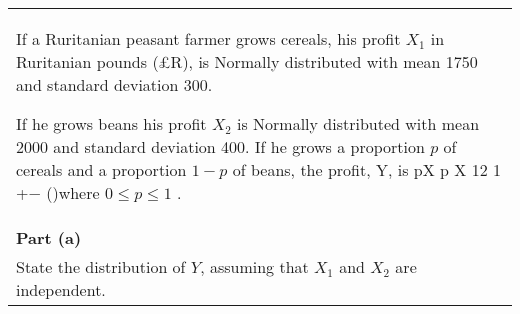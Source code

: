 \documentclass[a4paper,12pt]{article}
\begin{document}
\begin{table}[ht!]
     \centering
     \begin{tabular}{|p{15cm}|}
     \hline        
If a Ruritanian peasant farmer grows cereals, his profit $X_1$ in Ruritanian pounds (£R),  is Normally distributed with mean 1750 and standard deviation 300.  

If he grows beans his profit $X_2$ is Normally distributed with mean 2000 and standard deviation 400.  If he grows a proportion $p$ of cereals and a proportion $1−p$ of beans, the profit, Y, is pX p X 12 1 +− ()where $0\leq p\leq 1 $ .
\\
\noindent \textbf{Part (a)}\\
State the distribution of $Y$, assuming that $X_1$ and $X_2$ are independent.\\

 \hline
      \end{tabular}
    \end{table}
    
\end{document}
